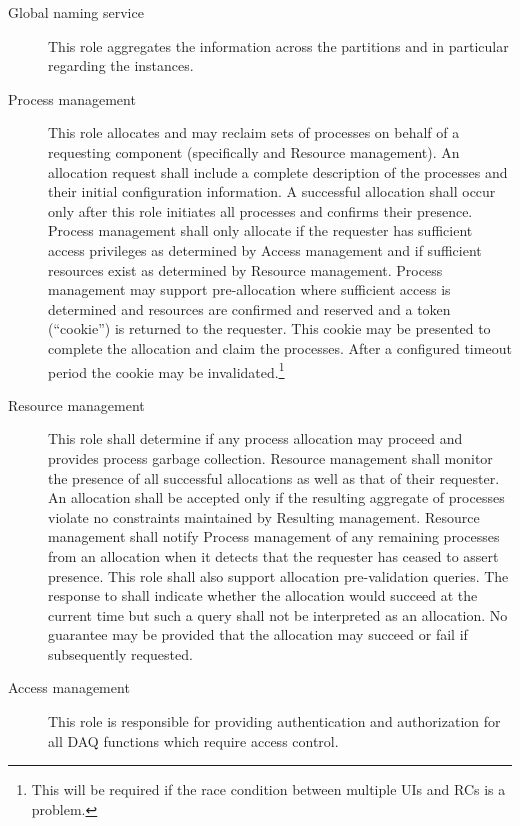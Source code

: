 \begin{description}
\item[Global naming service] This role aggregates the  information across the partitions and in particular regarding the  instances.

\item[Process management] This role allocates and may reclaim sets of processes on behalf of a requesting component (specifically  and Resource management). 
  An allocation request shall include a complete description of the processes and their initial configuration information. 
  A successful allocation shall occur only after this role initiates all processes and confirms their presence. 
  Process management shall only allocate if the requester has sufficient access privileges as determined by Access management and if sufficient resources exist as determined by Resource management. 
  Process management may support pre-allocation where sufficient access is determined and resources are confirmed and reserved and a token (``cookie'') is returned to the requester. 
  This cookie may be presented to complete the allocation and claim the processes. 
  After a configured timeout period the cookie may be invalidated.\footnote{This will be required if the race condition between multiple UIs and RCs is a problem.}  
  
\item[Resource management] This role shall determine if any process allocation may proceed and provides process garbage collection. 
  Resource management shall monitor the presence of all successful allocations as well as that of their requester.  
  An allocation shall be accepted only if the resulting aggregate of processes violate no constraints maintained by Resulting management.
  Resource management shall notify Process management of any remaining processes from an allocation when it detects that the requester has ceased to assert presence.
  This role shall also support allocation pre-validation queries. 
  The response to shall indicate whether the allocation would succeed at the current time but such a query shall not be interpreted as an allocation. 
  No guarantee may be provided that the allocation may succeed or fail if subsequently requested.

  
\item[Access management] This role is responsible for providing authentication and authorization for all DAQ functions which require access control.  

\end{description}

